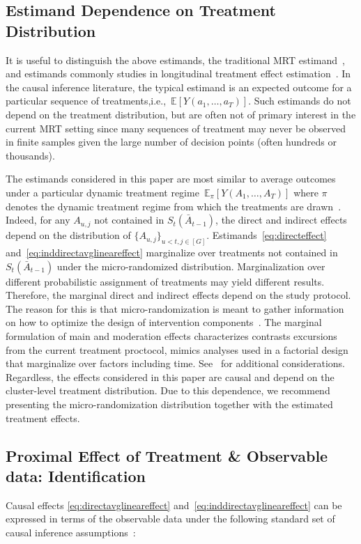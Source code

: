 \documentclass[12pt]{article}
\def\E{\mathbb{E}}
\begin{document}
\subsection{Estimand Dependence on Treatment Distribution}

It is useful to distinguish the above estimands, the traditional MRT estimand~\citep{Boruvkaetal}, and estimands commonly studies in longitudinal treatment effect estimation~\citep{Robins}. In the causal inference literature, the typical estimand is an expected outcome for a particular sequence of treatments,i.e.,~$\E \left[ Y(a_1,\ldots, a_T)\right]$.  Such estimands do not depend on the treatment distribution, but are often not of primary interest in the current MRT setting since many sequences of treatment may never be observed in finite samples given the large number of decision points (often hundreds or thousands).

The estimands considered in this paper are most similar to average outcomes under a particular dynamic treatment regime~$\E_\pi \left[ Y(A_1,\ldots, A_T)\right]$ where $\pi$ denotes the dynamic treatment regime from which the treatments are drawn~\citep{MurphyJASA2001}. Indeed, for any $A_{u,j}$ not contained in $S_t (\bar A_{t-1})$, the direct and indirect effects depend on the distribution of $\{ A_{u,j} \}_{u < t, j \in [G]}$.  Estimands~\eqref{eq:directeffect} and~\eqref{eq:inddirectavglineareffect} marginalize over treatments not contained in $S_t(\bar A_{t-1})$ under the micro-randomized distribution.  Marginalization over different probabilistic assignment of treatments may yield different results. Therefore, the marginal direct and indirect effects depend on the study protocol. The reason for this is that micro-randomization is meant to gather information on how to optimize the design of intervention components~\citep{Collins2018}.  The marginal formulation of main and moderation effects characterizes contrasts excursions from the current treatment proctocol, mimics analyses used in a factorial design that marginalize over factors including time. See~\citet[Section 8]{Qian2021} for additional considerations.  Regardless, the effects considered in this paper are causal and depend on the cluster-level treatment distribution.  Due to this dependence, we recommend presenting the micro-randomization distribution together with the estimated treatment effects.

\subsection{Proximal Effect of Treatment \& Observable data: Identification}
\label{section:prox_effects_data}
Causal effects \eqref{eq:directavglineareffect} and~\eqref{eq:inddirectavglineareffect} can be expressed in terms of the observable data under the following standard set of causal inference assumptions~\cite{Robins}:
\end{document}
